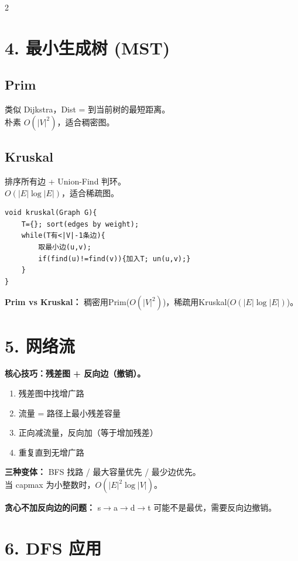 \documentclass[10pt,a4paper]{article}
\begin{document}
\begin{multicols}{2}
\section*{4. 最小生成树 (MST)}

\subsection*{Prim}

类似 Dijkstra，Dist = 到当前树的最短距离。\\
朴素 $O(|V|^2)$，适合稠密图。

\subsection*{Kruskal}

排序所有边 + Union-Find 判环。\\
$O(|E|\log|E|)$，适合稀疏图。

\begin{lstlisting}
void kruskal(Graph G){
    T={}; sort(edges by weight);
    while(T有<|V|-1条边){
        取最小边(u,v);
        if(find(u)!=find(v)){加入T; un(u,v);}
    }
}
\end{lstlisting}

\textbf{Prim vs Kruskal：} 稠密用Prim($O(|V|^2)$)，稀疏用Kruskal($O(|E|\log|E|)$)。

\section*{5. 网络流}

\textbf{核心技巧：残差图 + 反向边（撤销）。}

\begin{enumerate}
\item 残差图中找增广路
\item 流量 = 路径上最小残差容量
\item 正向减流量，反向加（等于增加残差）
\item 重复直到无增广路
\end{enumerate}

\textbf{三种变体：} BFS 找路 / 最大容量优先 / 最少边优先。\\
当 capmax 为小整数时，$O(|E|^2\log|V|)$。

\textbf{贪心不加反向边的问题：} s$\to$a$\to$d$\to$t 可能不是最优，需要反向边撤销。

\section*{6. DFS 应用}


\end{multicols}
\end{document}
